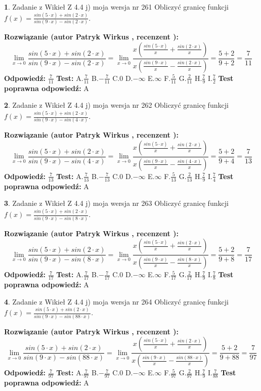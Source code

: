 \documentclass[12pt, a4paper]{article}
\theoremstyle{definition} %
\newtheorem{zad}{}
\newcommand{\zadStart}[1]{\begin{zad}#1\newline}
\newcommand{\zadStop}{\end{zad}}
\newcommand{\rozwStart}[2]{\noindent \textbf{Rozwiązanie (autor #1 , recenzent #2): }\newline}
\newcommand{\rozwStop}{\newline}
\newcommand{\odpStart}{\noindent \textbf{Odpowiedź:}\newline}
\newcommand{\odpStop}{\newline}
\newcommand{\testStart}{\noindent \textbf{Test:}\newline}
\newcommand{\testStop}{\newline}
\newcommand{\kluczStart}{\noindent \textbf{Test poprawna odpowiedź:}\newline}
\newcommand{\kluczStop}{\newline}
\begin{document}
\zadStart{Zadanie z Wikieł Z 4.4 j) moja wersja nr 261}
Obliczyć granicę funkcji $f(x)=\frac{sin(5\cdot x) +sin(2\cdot x)}{sin(9\cdot x) -sin(2\cdot x)}$.
\zadStop
\rozwStart{Patryk Wirkus}{}
$$\lim\limits_{x\to 0}\frac{sin(5\cdot x) +sin(2\cdot x)}{sin(9\cdot x) -sin(2\cdot x)}=\lim\limits_{x\to 0}\frac{x(\frac{sin(5\cdot x)}{x}+\frac{sin(2\cdot x)}{x})}{x(\frac{sin(9\cdot x)}{x}-\frac{sin(2\cdot x)}{x})}=\frac{5+2}{9+2} = \frac{7}{11}$$
\rozwStop
\odpStart
$\frac{7}{11}$
\odpStop
\testStart
A.$\frac{7}{11}$
B.$-\frac{7}{11}$
C.$0$
D.$-\infty$
E.$\infty$
F.$\frac{5}{11}$
G.$\frac{2}{11}$
H.$\frac{7}{9}$
I.$\frac{7}{2}$
\testStop
\kluczStart
A
\kluczStop



\zadStart{Zadanie z Wikieł Z 4.4 j) moja wersja nr 262}
Obliczyć granicę funkcji $f(x)=\frac{sin(5\cdot x) +sin(2\cdot x)}{sin(9\cdot x) -sin(4\cdot x)}$.
\zadStop
\rozwStart{Patryk Wirkus}{}
$$\lim\limits_{x\to 0}\frac{sin(5\cdot x) +sin(2\cdot x)}{sin(9\cdot x) -sin(4\cdot x)}=\lim\limits_{x\to 0}\frac{x(\frac{sin(5\cdot x)}{x}+\frac{sin(2\cdot x)}{x})}{x(\frac{sin(9\cdot x)}{x}-\frac{sin(4\cdot x)}{x})}=\frac{5+2}{9+4} = \frac{7}{13}$$
\rozwStop
\odpStart
$\frac{7}{13}$
\odpStop
\testStart
A.$\frac{7}{13}$
B.$-\frac{7}{13}$
C.$0$
D.$-\infty$
E.$\infty$
F.$\frac{5}{13}$
G.$\frac{2}{13}$
H.$\frac{7}{9}$
I.$\frac{7}{4}$
\testStop
\kluczStart
A
\kluczStop



\zadStart{Zadanie z Wikieł Z 4.4 j) moja wersja nr 263}
Obliczyć granicę funkcji $f(x)=\frac{sin(5\cdot x) +sin(2\cdot x)}{sin(9\cdot x) -sin(8\cdot x)}$.
\zadStop
\rozwStart{Patryk Wirkus}{}
$$\lim\limits_{x\to 0}\frac{sin(5\cdot x) +sin(2\cdot x)}{sin(9\cdot x) -sin(8\cdot x)}=\lim\limits_{x\to 0}\frac{x(\frac{sin(5\cdot x)}{x}+\frac{sin(2\cdot x)}{x})}{x(\frac{sin(9\cdot x)}{x}-\frac{sin(8\cdot x)}{x})}=\frac{5+2}{9+8} = \frac{7}{17}$$
\rozwStop
\odpStart
$\frac{7}{17}$
\odpStop
\testStart
A.$\frac{7}{17}$
B.$-\frac{7}{17}$
C.$0$
D.$-\infty$
E.$\infty$
F.$\frac{5}{17}$
G.$\frac{2}{17}$
H.$\frac{7}{9}$
I.$\frac{7}{8}$
\testStop
\kluczStart
A
\kluczStop



\zadStart{Zadanie z Wikieł Z 4.4 j) moja wersja nr 264}
Obliczyć granicę funkcji $f(x)=\frac{sin(5\cdot x) +sin(2\cdot x)}{sin(9\cdot x) -sin(88\cdot x)}$.
\zadStop
\rozwStart{Patryk Wirkus}{}
$$\lim\limits_{x\to 0}\frac{sin(5\cdot x) +sin(2\cdot x)}{sin(9\cdot x) -sin(88\cdot x)}=\lim\limits_{x\to 0}\frac{x(\frac{sin(5\cdot x)}{x}+\frac{sin(2\cdot x)}{x})}{x(\frac{sin(9\cdot x)}{x}-\frac{sin(88\cdot x)}{x})}=\frac{5+2}{9+88} = \frac{7}{97}$$
\rozwStop
\odpStart
$\frac{7}{97}$
\odpStop
\testStart
A.$\frac{7}{97}$
B.$-\frac{7}{97}$
C.$0$
D.$-\infty$
E.$\infty$
F.$\frac{5}{97}$
G.$\frac{2}{97}$
H.$\frac{7}{9}$
I.$\frac{7}{88}$
\testStop
\kluczStart
A
\kluczStop
\end{document}
